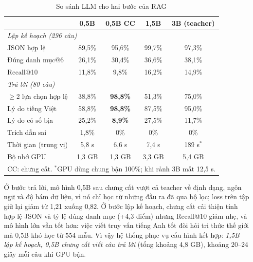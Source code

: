 \documentclass[conference,a4paper]{IEEEtran}
\begin{document}
\begin{table}[t]
\caption{So sánh LLM cho hai bước của RAG}
\label{tab:distill}
\centering
\setlength{\tabcolsep}{3.2pt}
\begin{tabular}{lcccc}
\toprule
 & 0,5B & \textbf{0,5B CC} & 1,5B & 3B (teacher)\\
\midrule
\multicolumn{5}{l}{\emph{Lập kế hoạch (296 câu)}}\\
JSON hợp lệ & 89,5\% & 95,6\% & 99,7\% & 97,3\%\\
Đúng danh mục@6 & 26,1\% & 30,4\% & 36,6\% & 38,1\%\\
Recall@10 & 11,8\% & 9,8\% & 16,2\% & 14,9\%\\
\midrule
\multicolumn{5}{l}{\emph{Trả lời (80 câu)}}\\
$\geq$2 lựa chọn hợp lệ & 38,8\% & \textbf{98,8\%} & 51,3\% & 75,0\%\\
Lý do tiếng Việt & 58,8\% & \textbf{98,8\%} & 87,5\% & 95,0\%\\
Lý do có số bịa & 25,2\% & \textbf{8,9\%} & 27,5\% & 11,7\%\\
Trích dẫn sai & 1,8\% & 0\% & 0\% & 0\%\\
Thời gian (trung vị) & 5,8 s & 6,6 s & 7,4 s & 189 s$^\ast$\\
Bộ nhớ GPU & 1,3 GB & 1,3 GB & 3,3 GB & 5,4 GB\\
\bottomrule
\multicolumn{5}{l}{\scriptsize CC: chưng cất. $^\ast$GPU dùng chung bận 100\%; khi rảnh 3B mất 12,5 s.}
\end{tabular}
\end{table}

Ở bước trả lời, mô hình 0,5B sau chưng cất vượt cả teacher về định dạng, ngôn ngữ và độ bám dữ liệu, vì nó chỉ học từ những đầu ra đã qua bộ lọc; loss trên tập giữ lại giảm từ 1,21 xuống 0,82. Ở bước lập kế hoạch, chưng cất cải thiện tính hợp lệ JSON và tỷ lệ đúng danh mục (+4,3 điểm) nhưng Recall@10 giảm nhẹ, và mô hình lớn vẫn tốt hơn: việc viết truy vấn tiếng Anh tốt đòi hỏi tri thức thế giới mà 0,5B khó học từ 554 mẫu. Vì vậy hệ thống phục vụ cấu hình kết hợp: \emph{1,5B lập kế hoạch, 0,5B chưng cất viết câu trả lời} (tổng khoảng 4,8 GB), khoảng 20--24 giây mỗi câu khi GPU bận.

\end{document}
